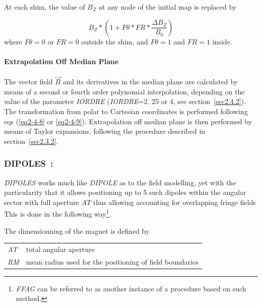 \noindent At each shim, the value of $ B_Z $ at any node of the initial map is replaced by 

$$ B_Z \ast  \left(1+F\theta  \ast  FR \ast  \frac{\Delta B_Z }{ B_0} \right)
$$
%
 where $ F\theta =0 $ or $ FR=0 $ outside the shim, and $ F\theta =1$ and $ FR=1 $ inside.  
\bigskip

\paragraph{Extrapolation Off Median Plane} 

\noindent The vector field $ \vec  B $ and its derivatives in the median plane
are calculated by means of a second or fourth order polynomial 
interpolation, depending 
on the value of the parameter \textsl{IORDRE} (\textsl{IORDRE}=2, 25 or 4, see 
section~\ref{sec2.4.2}). 
The transformation from polar to Cartesian coordinates is 
performed following eqs (\ref{eq2-4-8} or \ref{eq2-4-9}). Extrapolation off median plane is then 
performed by means of Taylor expansions, following the procedure described 
in section~\ref{sec2.3.2}. 









\newpage

\subsubsection*{DIPOLES~: \DIPOLESTitl~\cite{reportNIMFFAG}} \label{DIPOLES} 
\medskip

\noindent \textsl{DIPOLES} works much like \textsl{DIPOLE} 
as to the field modelling, yet with the particularity that it allows positioning up to 5 such 
dipoles within the angular sector with full aperture $AT$ thus allowing 
accounting for overlapping fringe fields  
This is done in the following 
way\footnote{\textsl{FFAG} can be referred to as another instance of a procedure based on such method.}. 

\bigskip

\noindent  The dimensionning of the magnet is defined by

\bigskip

 \begin{tabular}{>{\sl}l!{~:}l}
	 AT &  total angular aperture \\
	 RM & mean radius used for the positioning of field boundaries\\
 \end{tabular}

